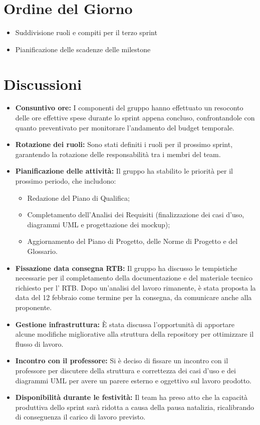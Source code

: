 \documentclass[a4paper,12pt]{article}
\begin{document}
\section{Ordine del Giorno}
\begin{itemize}
    \item Suddivisione ruoli e compiti per il terzo sprint
    \item Pianificazione delle scadenze delle milestone
\end{itemize}

\section{Discussioni}
\begin{itemize}
    \item \textbf{Consuntivo ore:} I componenti del gruppo hanno effettuato un resoconto delle ore effettive spese durante lo sprint appena concluso, confrontandole con quanto preventivato per monitorare l'andamento del budget temporale.
    \item \textbf{Rotazione dei ruoli:} Sono stati definiti i ruoli per il prossimo sprint, garantendo la rotazione delle responsabilità tra i membri del team.
    \item \textbf{Pianificazione delle attività:} Il gruppo ha stabilito le priorità per il prossimo periodo, che includono:
    \begin{itemize}
        \item Redazione del Piano di Qualifica;
        \item Completamento dell'Analisi dei Requisiti (finalizzazione dei casi d'uso, diagrammi UML e progettazione dei mockup);
        \item Aggiornamento del Piano di Progetto, delle Norme di Progetto e del Glossario.
    \end{itemize}
    \item \textbf{Fissazione data consegna RTB:} Il gruppo ha discusso le tempistiche necessarie per il completamento della documentazione e del materiale tecnico richiesto per l' RTB. Dopo un'analisi del lavoro rimanente, è stata proposta la data del 12 febbraio come termine per la consegna, da comunicare anche alla proponente.
    \item \textbf{Gestione infrastruttura:} È stata discussa l'opportunità di apportare alcune modifiche migliorative alla struttura della repository per ottimizzare il flusso di lavoro.
    \item \textbf{Incontro con il professore:} Si \`e deciso di fissare un incontro con il professore per discutere della struttura e correttezza dei casi d'uso e dei diagrammi UML per avere un parere esterno e oggettivo sul lavoro prodotto.
    \item \textbf{Disponibilità durante le festività:} Il team ha preso atto che la capacità produttiva dello sprint sarà ridotta a causa della pausa natalizia, ricalibrando di conseguenza il carico di lavoro previsto.
\end{itemize}
\end{document}
